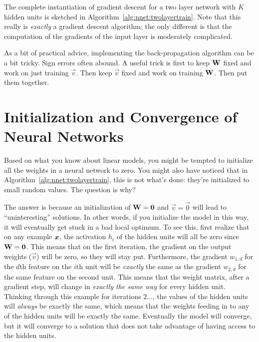The complete instantiation of gradient descent for a two layer network
with $K$ hidden units is sketched in
Algorithm~\ref{alg:nnet:twolayertrain}.  Note that this really is
\emph{exactly} a gradient descent algorithm; the only different is
that the computation of the gradients of the input layer is moderately
complicated.


As a bit of practical advice, implementing the back-propagation
algorithm can be a bit tricky.  Sign errors often abound.  A useful
trick is first to keep $\text{\bf W}$ fixed and work on just training $\vec
v$.  Then keep $\vec v$ fixed and work on training $\text{\bf W}$.  Then put
them together.


\section{Initialization and Convergence of Neural Networks}

Based on what you know about linear models, you might be tempted to
initialize all the weights in a neural network to zero.  You might
also have noticed that in Algorithm~\ref{alg:nnet:twolayertrain}, this
is not what's done: they're initialized to small random values.  The
question is why?

The answer is because an initialization of $\text{\bf W} = \text{\bf 0}$ and $\vec
v = \vec 0$ will lead to ``uninteresting'' solutions.  In other words,
if you initialize the model in this way, it will eventually get stuck
in a bad local optimum.  To see this, first realize that on any
example ${\boldsymbol{x}}$, the activation $h_i$ of the hidden units will all be
zero since $\text{\bf W} = \text{\bf 0}$.  This means that on the first iteration,
the gradient on the output weights ($\vec v$) will be zero, so they
will stay put.  Furthermore, the gradient $w_{1,d}$ for the $d$th
feature on the $i$th unit will be \emph{exactly} the same as the
gradient $w_{2,d}$ for the same feature on the second unit.  This
means that the weight matrix, after a gradient step, will change in
\emph{exactly the same way} for every hidden unit.  Thinking through
this example for iterations $2\dots$, the values of the hidden units
will \emph{always} be exactly the same, which means that the weights
feeding in to any of the hidden units will be exactly the same.
Eventually the model will converge, but it will converge to a solution
that does not take advantage of having access to the hidden units.

